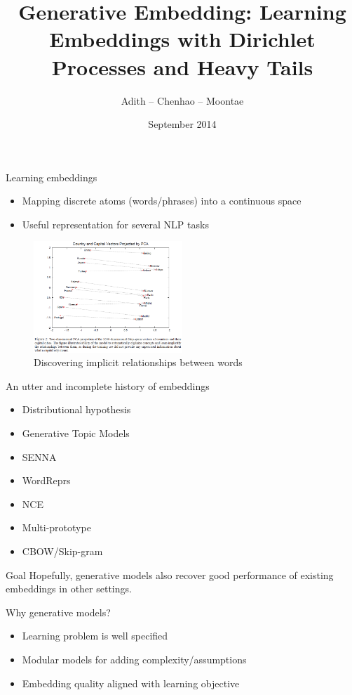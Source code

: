 \documentclass{beamer}
\title[ProbEmbed]{Generative Embedding: Learning Embeddings with Dirichlet Processes and Heavy Tails}
\author{Adith -- Chenhao -- Moontae}
\institute{Cornell}
\date{September 2014}
\begin{document}
\begin{frame}
\titlepage
\end{frame}

\begin{frame}{Learning embeddings}
  \begin{itemize}
    \item Mapping discrete atoms (words/phrases) into a continuous space
    \item Useful representation for several NLP tasks \cite{Turian}
  \end{itemize}
\begin{figure}[h!]
  \caption{Discovering implicit relationships between words \cite{CBOW}}
  \centering
    \includegraphics[width=0.5\textwidth]{CBOW.png}
\end{figure}
\end{frame}

\begin{frame}{An utter and incomplete history of embeddings}
  \begin{itemize}
    \item Distributional hypothesis \cite{Lillian}
    \item Generative Topic Models \cite{LDA}
    \item SENNA \cite{Collobert}
    \item WordReprs \cite{Turian}
    \item NCE \cite{Mnih}
    \item Multi-prototype \cite{Socher}
    \item CBOW/Skip-gram \cite{CBOW}
  \end{itemize}
\end{frame}

\begin{frame}{Goal}
Hopefully, generative models also recover good performance of existing embeddings in other settings.
\end{frame}

\begin{frame}{Why generative models?}
  \begin{itemize}
    \item Learning problem is well specified
    \item Modular models for adding complexity/assumptions
    \item Embedding quality aligned with learning objective
  \end{itemize}
\end{frame}
\end{document}
